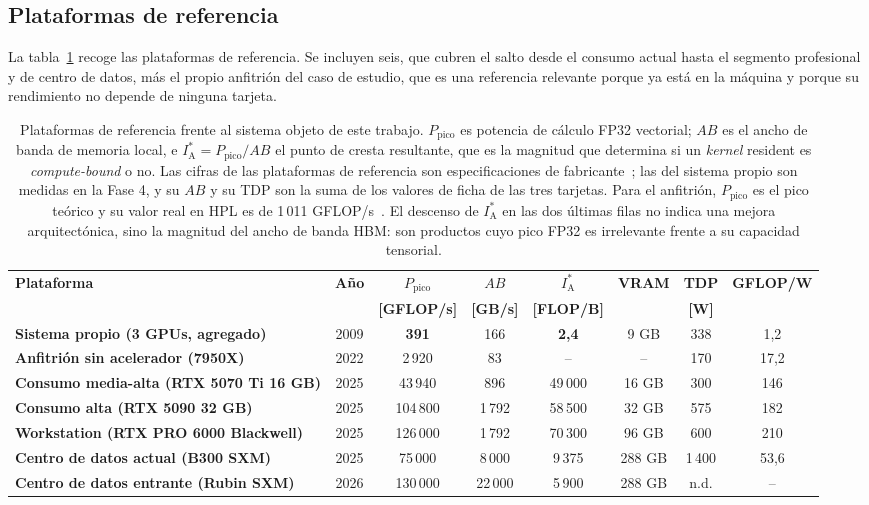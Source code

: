 \documentclass[a4paper,11pt]{article}
\begin{document}
\subsection*{Plataformas de referencia}

La tabla~\ref{tab:comparativa} recoge las plataformas de referencia. Se incluyen seis, que cubren el salto desde el consumo
actual hasta el segmento profesional y de centro de datos, más el propio anfitrión del caso de estudio, que es una referencia
relevante porque ya está en la máquina y porque su rendimiento no depende de ninguna tarjeta.

\begin{table}[t]
\centering
\footnotesize
\setlength{\tabcolsep}{3.5pt}
\caption{Plataformas de referencia frente al sistema objeto de este trabajo. $P_{\text{pico}}$ es potencia de cálculo FP32
vectorial; $AB$ es el ancho de banda de memoria local, e $I_{\text{A}}^{*} = P_{\text{pico}}/AB$ el punto de cresta resultante,
que es la magnitud que determina si un \textit{kernel} resident es \emph{compute-bound} o no. Las cifras de las plataformas de
referencia son especificaciones de fabricante~\cite{nvidiac1060,nvidiartxblackwell,nvidiaproblackwell,nvidiablackwellultra,nvidiahgx};
las del sistema propio son medidas en la Fase 4, y su $AB$ y su TDP son la suma de los valores de ficha de las tres tarjetas.
Para el anfitrión, $P_{\text{pico}}$ es el pico teórico y su valor real en HPL es de 1\,011 GFLOP/s~\cite{puget7950x}. El
descenso de $I_{\text{A}}^{*}$ en las dos últimas filas no indica una mejora arquitectónica, sino la magnitud del ancho de banda
HBM: son productos cuyo pico FP32 es irrelevante frente a su capacidad tensorial.}
\label{tab:comparativa}
\begin{tabular}{>{\raggedright\arraybackslash}p{3.6cm} c c c c c c c}
\toprule
\textbf{Plataforma} & \textbf{Año} & \textbf{$P_{\text{pico}}$} & \textbf{$AB$} & \textbf{$I_{\text{A}}^{*}$} & \textbf{VRAM} & \textbf{TDP} & \textbf{GFLOP/W} \\
& & \textbf{[GFLOP/s]} & \textbf{[GB/s]} & \textbf{[FLOP/B]} & & \textbf{[W]} & \\
\midrule
\textbf{Sistema propio (3 GPUs, agregado)} & 2009 & \textbf{391} & 166 & \textbf{2,4} & 9 GB & 338 & 1,2 \\
\textbf{Anfitrión sin acelerador (7950X)} & 2022 & 2\,920 & 83 & -- & -- & 170 & 17,2 \\
\textbf{Consumo media-alta (RTX 5070 Ti 16 GB)} & 2025 & 43\,940 & 896 & 49\,000 & 16 GB & 300 & 146 \\
\textbf{Consumo alta (RTX 5090 32 GB)} & 2025 & 104\,800 & 1\,792 & 58\,500 & 32 GB & 575 & 182 \\
\textbf{Workstation (RTX PRO 6000 Blackwell)} & 2025 & 126\,000 & 1\,792 & 70\,300 & 96 GB & 600 & 210 \\
\textbf{Centro de datos actual (B300 SXM)} & 2025 & 75\,000 & 8\,000 & 9\,375 & 288 GB & 1\,400 & 53,6 \\
\textbf{Centro de datos entrante (Rubin SXM)} & 2026 & 130\,000 & 22\,000 & 5\,900 & 288 GB & n.d. & -- \\
\bottomrule
\end{tabular}
\end{table}
\end{document}
